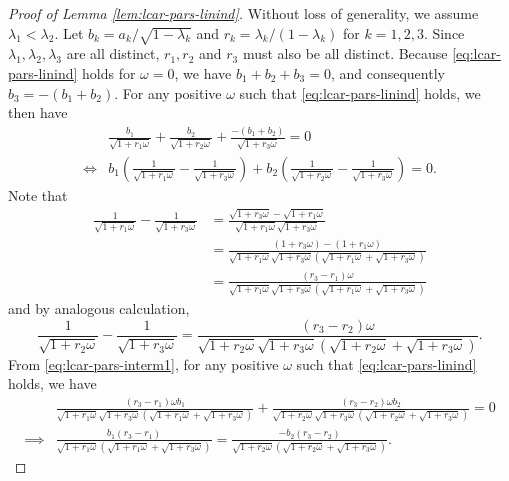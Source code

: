 \documentclass[11pt]{article}
\theoremstyle{definition}
\theoremstyle{remark}
\begin{document}
\begin{proof}[Proof of Lemma \ref{lem:lcar-pars-linind}]
Without loss of generality, we assume $\lambda_1 < \lambda_2$. Let $b_k = a_k/\sqrt{1-\lambda_k}$ and $r_k = \lambda_k/(1-\lambda_k)$ for $k=1,2,3$. Since $\lambda_1,\lambda_2,\lambda_3$ are all distinct, $r_1,r_2$ and $r_3$ must also be all distinct. Because \eqref{eq:lcar-pars-linind} holds for $\omega=0$, we have $b_1+b_2+b_3=0$, and consequently $b_3 = -(b_1+b_2)$. For any positive $\omega$ such that \eqref{eq:lcar-pars-linind} holds, we then have 
\begin{align}
&\frac{b_1}{\sqrt{1+r_1\omega}} + \frac{b_2}{\sqrt{1+r_2\omega}} + \frac{-(b_1+b_2)}{\sqrt{1+r_3\omega}} =0 \nonumber\\
\iff & b_1\left(\frac{1}{\sqrt{1+r_1\omega}} - \frac{1}{\sqrt{1+r_3\omega}} \right) + b_2\left( \frac{1}{\sqrt{1+r_2\omega}} - \frac{1}{\sqrt{1+r_3\omega}}\right) =0. \label{eq:lcar-pars-interm1} 
\end{align}
Note that
\begin{align*}
\frac{1}{\sqrt{1+r_1\omega}} - \frac{1}{\sqrt{1+r_3\omega}} &= \frac{\sqrt{1+r_3\omega} - \sqrt{1+r_1\omega}}{\sqrt{1+r_1\omega}\sqrt{1+r_3\omega}} \\
&= \frac{(1+r_3\omega) - (1+r_1\omega)}{\sqrt{1+r_1\omega}\sqrt{1+r_3\omega}(\sqrt{1+r_1\omega}+\sqrt{1+r_3\omega})}\\
&= \frac{(r_3-r_1)\omega}{\sqrt{1+r_1\omega}\sqrt{1+r_3\omega}(\sqrt{1+r_1\omega}+\sqrt{1+r_3\omega})}
\end{align*} 
and by analogous calculation,
\[\frac{1}{\sqrt{1+r_2\omega}} - \frac{1}{\sqrt{1+r_3\omega}} = \frac{(r_3-r_2)\omega}{\sqrt{1+r_2\omega}\sqrt{1+r_3\omega}(\sqrt{1+r_2\omega}+\sqrt{1+r_3\omega})}. \]
From \eqref{eq:lcar-pars-interm1}, for any positive $\omega$ such that \eqref{eq:lcar-pars-linind} holds, we have
\begin{align}\label{eq:b1_b2_re}
&\frac{(r_3-r_1)\omega b_1}{\sqrt{1+r_1\omega}\sqrt{1+r_3\omega}(\sqrt{1+r_1\omega}+\sqrt{1+r_3\omega})} + \frac{(r_3-r_2)\omega b_2}{\sqrt{1+r_2\omega}\sqrt{1+r_3\omega}(\sqrt{1+r_2\omega}+\sqrt{1+r_3\omega})} =0 
\nonumber
\\
\implies & \frac{b_1(r_3-r_1)}{\sqrt{1+r_1\omega}(\sqrt{1+r_1\omega} + \sqrt{1+r_3\omega})} = \frac{-b_2(r_3-r_2)}{\sqrt{1+r_2\omega}(\sqrt{1+r_2\omega} + \sqrt{1+r_3\omega})}. 
\end{align}



\end{proof}
\end{document}
